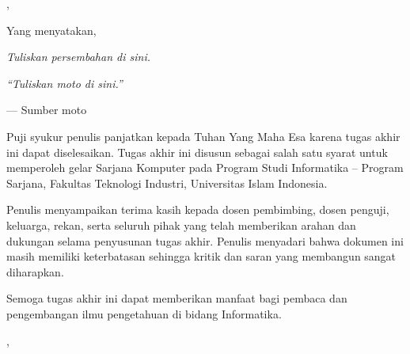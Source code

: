 \vfill
\begin{flushright}
  \kotaTerbit, \tanggalPengesahan\par
  Yang menyatakan,\par
  \vspace{25mm}
  \textbf{\namaMahasiswa}\par
  \nimMahasiswa
\end{flushright}

\begin{center}
  \vfill
  \textit{Tuliskan persembahan di sini.}
  \vfill
\end{center}

\begin{center}
  \vfill
  \textit{``Tuliskan moto di sini.''}\par
  \vspace{4mm}
  --- Sumber moto
  \vfill
\end{center}


Puji syukur penulis panjatkan kepada Tuhan Yang Maha Esa karena tugas akhir ini dapat diselesaikan. Tugas akhir ini disusun sebagai salah satu syarat untuk memperoleh gelar Sarjana Komputer pada Program Studi Informatika -- Program Sarjana, Fakultas Teknologi Industri, Universitas Islam Indonesia.

Penulis menyampaikan terima kasih kepada dosen pembimbing, dosen penguji, keluarga, rekan, serta seluruh pihak yang telah memberikan arahan dan dukungan selama penyusunan tugas akhir. Penulis menyadari bahwa dokumen ini masih memiliki keterbatasan sehingga kritik dan saran yang membangun sangat diharapkan.

Semoga tugas akhir ini dapat memberikan manfaat bagi pembaca dan pengembangan ilmu pengetahuan di bidang Informatika.

\vfill
\begin{flushright}
  \kotaTerbit, \bulanLulus\ \tahunLulus\par
  \vspace{18mm}
  \textbf{\namaMahasiswa}
\end{flushright}


